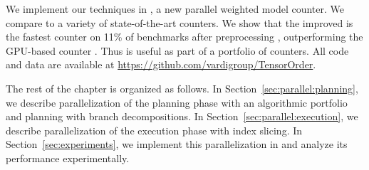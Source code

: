 We implement our techniques in , a new parallel weighted model counter. We compare  to a variety of state-of-the-art counters. We show that the improved  is the fastest counter on 11\% of benchmarks after preprocessing \cite{LM14}, outperforming the GPU-based counter  \cite{FHZ19}. Thus  is useful as part of a portfolio of counters. All code and data are available at  \url{https://github.com/vardigroup/TensorOrder}.

The rest of the chapter is organized as follows. 
In Section~\ref{sec:parallel:planning}, we describe parallelization of the planning phase with an algorithmic portfolio and planning with branch decompositions.
In Section~\ref{sec:parallel:execution}, we describe parallelization of the execution phase with index slicing. 
In Section~\ref{sec:experiments}, we implement this parallelization in  and analyze its performance experimentally.







